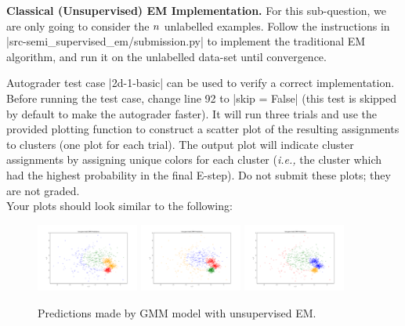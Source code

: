 \item {}
\textbf{Classical (Unsupervised) EM Implementation.}
For this sub-question, we are only going to consider the ${n}$ unlabelled examples. Follow the instructions in |src-semi_supervised_em/submission.py| to implement the traditional EM algorithm, and run it on the unlabelled data-set until convergence.

Autograder test case |2d-1-basic| can be used to verify a correct implementation. Before running the test case, change line 92 to |skip = False| (this test is skipped by default to make the autograder faster).  It will run three trials and use the provided plotting function to construct a scatter plot of the resulting assignments to clusters (one plot for each trial). The output plot will indicate cluster assignments by assigning unique colors for each cluster (\emph{i.e.,} the cluster which had the highest probability in the final E-step).  Do not submit these plots; they are not graded.\\

Your plots should look similar to the following:

  \begin{figure}[H]
    \centering
    \includegraphics[width=0.3\textwidth]{02-semi_supervised_em/pred_0.pdf}
    \includegraphics[width=0.3\textwidth]{02-semi_supervised_em/pred_1.pdf}
    \includegraphics[width=0.3\textwidth]{02-semi_supervised_em/pred_2.pdf}
    \caption{Predictions made by GMM model with unsupervised EM.}
  \end{figure}

